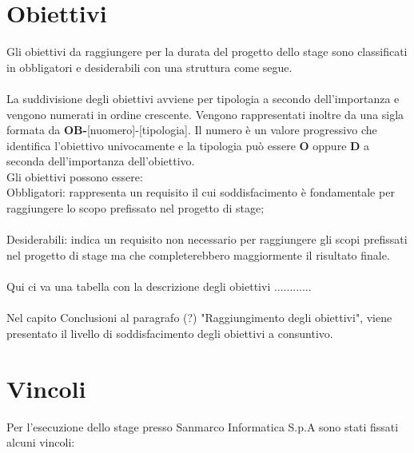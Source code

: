 \section{Obiettivi}

Gli obiettivi da raggiungere per la durata del progetto dello stage sono classificati in obbligatori e desiderabili con una struttura come segue.
\\ \\
 
La suddivisione degli obiettivi avviene per tipologia a secondo dell'importanza e vengono numerati in ordine crescente. Vengono rappresentati inoltre da una sigla formata da \textbf{OB-}[nuomero]-[tipologia]. Il numero è un valore progressivo che identifica l'obiettivo univocamente e la tipologia può essere \textbf{O} oppure \textbf{D} a seconda dell'importanza dell'obiettivo. \\

Gli obiettivi possono essere: \\

Obbligatori: rappresenta un requisito il cui soddisfacimento è fondamentale
per raggiungere lo scopo prefissato nel progetto di stage;
\\\\
Desiderabili: indica un requisito non necessario per raggiungere gli scopi
prefissati nel progetto di stage ma che completerebbero maggiormente il risultato finale.
\\\\

Qui ci va una tabella con la descrizione degli obiettivi ............ \\\\

Nel capito Conclusioni al paragrafo (?) "Raggiungimento degli obiettivi", viene presentato il livello di soddisfacimento degli obiettivi a consuntivo.



\section{Vincoli}
Per l'esecuzione dello stage presso Sanmarco Informatica S.p.A sono stati fissati alcuni vincoli: \\\\

